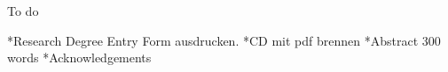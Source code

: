To do

*Research Degree Entry Form ausdrucken.
*CD mit pdf brennen
*Abstract 300 words
*Acknowledgements
